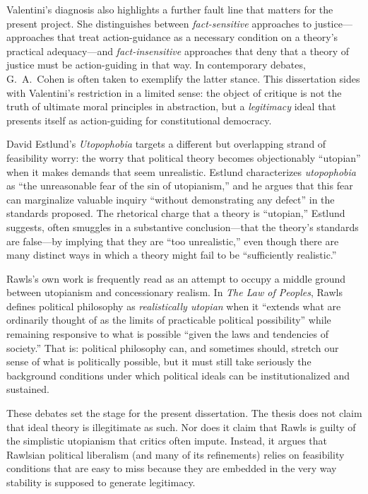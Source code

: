 \documentclass[12pt]{report}
\begin{document}
Valentini's diagnosis also highlights a further fault line that matters for the present project. She distinguishes between \emph{fact-sensitive} approaches to justice---approaches that treat action-guidance as a necessary condition on a theory's practical adequacy---and \emph{fact-insensitive} approaches that deny that a theory of justice must be action-guiding in that way.\parencite[p.~333]{valentini2009paradox} In contemporary debates, G.~A.~Cohen is often taken to exemplify the latter stance.\parencite[p.~20]{cohen2008rescuing} This dissertation sides with Valentini's restriction in a limited sense: the object of critique is not the truth of ultimate moral principles in abstraction, but a \emph{legitimacy} ideal that presents itself as action-guiding for constitutional democracy.

David Estlund's \emph{Utopophobia} targets a different but overlapping strand of feasibility worry: the worry that political theory becomes objectionably ``utopian'' when it makes demands that seem unrealistic. Estlund characterizes \emph{utopophobia} as ``the unreasonable fear of the sin of utopianism,'' and he argues that this fear can marginalize valuable inquiry ``without demonstrating any defect'' in the standards proposed.\parencite[p.~6]{estlund2019utopophobia} The rhetorical charge that a theory is ``utopian,'' Estlund suggests, often smuggles in a substantive conclusion---that the theory's standards are false---by implying that they are ``too unrealistic,'' even though there are many distinct ways in which a theory might fail to be ``sufficiently realistic.''\parencite[p.~6]{estlund2019utopophobia}

Rawls's own work is frequently read as an attempt to occupy a middle ground between utopianism and concessionary realism. In \emph{The Law of Peoples}, Rawls defines political philosophy as \emph{realistically utopian} when it ``extends what are ordinarily thought of as the limits of practicable political possibility'' while remaining responsive to what is possible ``given the laws and tendencies of society.''\parencite[p.~11]{rawls1999peoples} That is: political philosophy can, and sometimes should, stretch our sense of what is politically possible, but it must still take seriously the background conditions under which political ideals can be institutionalized and sustained.

These debates set the stage for the present dissertation. The thesis does not claim that ideal theory is illegitimate as such. Nor does it claim that Rawls is guilty of the simplistic utopianism that critics often impute. Instead, it argues that Rawlsian political liberalism (and many of its refinements) relies on feasibility conditions that are easy to miss because they are embedded in the very way stability is supposed to generate legitimacy.
\end{document}
